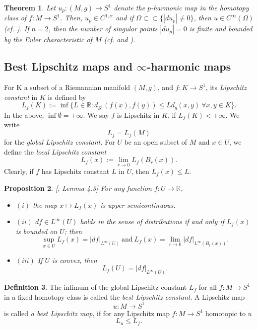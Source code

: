 \documentclass{ip-journal}
\newtheorem{theorem}{Theorem}[section]
\newtheorem{proposition}[theorem]{Proposition}
\theoremstyle{definition}
\newtheorem{definition}[theorem]{Definition}
\numberwithin{equation}{section}
\newcommand{\R}{\mathbb R}
\begin{document}
\begin{theorem} \label{nonsingular} Let
$u_p: (M, g) \rightarrow S^1$
denote the $p$-harmonic map in the homotopy class of $f: M \rightarrow S^1$. Then,  $u_p \in C^{1, \alpha}$ and if $\Omega \subset \subset \{|du_p| \neq 0\}$, then $u \in  C^\infty(\Omega)$ (cf. \cite{uhlen}). If $n=2$, then  the number of singular points $|du_p|= 0$ is finite and bounded by the Euler characteristic of $M$ (cf. \cite{manfredi} and \cite{aless}).  
\end{theorem}

\subsection{ Best Lipschitz maps and $\infty$-harmonic maps}\label{lipconst}
For K  a subset of a Riemannian manifold  $(M, g)$,  and $f: K \rightarrow S^1$,  its   {\it{Lipschitz constant}} in $K$  is defined by
\[
L_f(K):= \inf \{ L \in \R : d_{S^1}(f(x), f(y)) \leq Ld_g(x,y) \  \forall x, y \in K \} .
\]
In the above, $\inf \emptyset = +\infty$. We say $f$ is Lipschitz in $K$, if 
$L_f(K) < +\infty$. We write 
\[
L_f=L_f(M)
\]
for the {\it global Lipschitz constant.}
For $U$ be an open subset of $M$ and $x \in U$, we define the {\it{local Lipschitz constant }}
\[
L_f(x) := \lim_{r \rightarrow 0} L_f(B_r (x)).
\]
Clearly, if $f$ has Lipschitz constant $L$ in $U$, then
$L_f(x) \leq L.$


\begin{proposition}\label{crandal0}[\cite{crandal}, Lemma 4.3] For any function $f:U \rightarrow \R$, 
\begin{itemize}
\item $(i)$ the map $x \mapsto L_f(x)$ is upper semicontinuous.
\item $(ii)$  $ df \in  L^\infty(U)$ holds in the sense of distributions if and only if $L_f(x)$ is bounded
on $U$;  then
\[
\sup_{x \in U} L_f(x)= |df|_{L^\infty(U)}\ \mbox{and} \ L_f(x)=\lim_{r \rightarrow 0}|df|_{L^\infty(B_r(x))}.
\]
\item $(iii)$ If $U$ is convex, then
\[
 L_f(U)=|df|_{L^\infty(U)}.
\]
\end{itemize}
\end{proposition}

\begin{definition}\label{defbl} 
The infimum of the global Lipschitz constant $L_f$ for all $f:M \rightarrow S^1$ in a fixed homotopy class is called the {\it{best Lipschitz constant}}. A Lipschitz map
\[
u: M \rightarrow S^1
\]
is called {\it{a best Lipschitz  map}},  if for any  Lipschitz map $f: M \rightarrow S^1 $  homotopic to $u$ 
\begin{equation*}
L_u \leq L_f. 
\end{equation*}

\end{definition}
\end{document}
